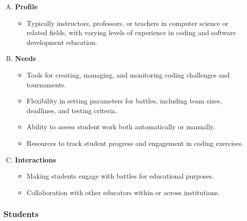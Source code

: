 \begin{enumerate}[A.]
    \item \textbf{Profile}

        \begin{itemize}
            \item Typically instructors, professors, or teachers in computer science or related fields, with varying levels of experience in coding and software development education.
        \end{itemize}

    \item \textbf{Needs}

        \begin{itemize}
            \item Tools for creating, managing, and monitoring coding challenges and tournaments.
            \item Flexibility in setting parameters for battles, including team sizes, deadlines, and testing criteria.
            \item Ability to assess student work both automatically or manually.
            \item Resources to track student progress and engagement in coding exercises.
        \end{itemize}

    \item \textbf{Interactions}

        \begin{itemize}
            \item Making students engage with battles for educational purposes.
            \item Collaboration with other educators within or across institutions.
        \end{itemize}
    
\end{enumerate}

\subsubsection{Students}

